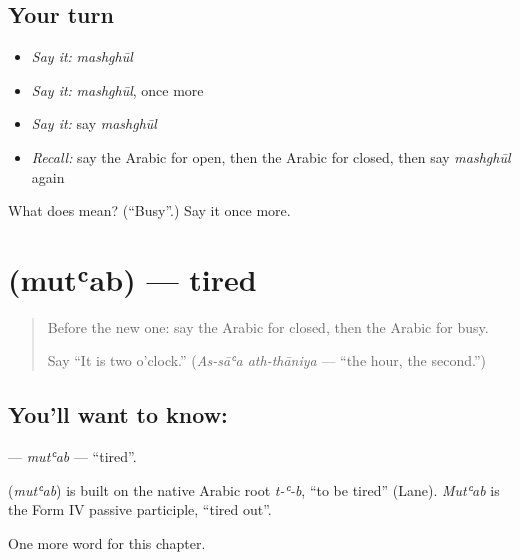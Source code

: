 \subsection*{Your turn}
\begin{itemize}
\raggedright
  \item \emph{Say it:} \emph{mashghūl}
  \item \emph{Say it:} \emph{mashghūl}, once more
  \item \emph{Say it:} say \emph{mashghūl}
  \item \emph{Recall:} say the Arabic for open, then the Arabic for closed, then say \emph{mashghūl} again
\end{itemize}

\begin{tcolorbox}[breakable,colback=teal!4,colframe=teal!35!black,title={Before you move on}]
What does  mean? (\textquotedblleft{}Busy\textquotedblright{}.) Say it once more.
\end{tcolorbox}
\section[\texorpdfstring{\ar{متعب} (mutʿab)}{متعب (mutʿab)}]{ (mutʿab) — tired}

\label{lesson:AR-C147-mutab}



\begin{quote}
Before the new one: say the Arabic for closed, then the Arabic for busy.

Say \textquotedblleft{}It is two o’clock.\textquotedblright{} (\emph{As-sāʿa ath-thāniya} — \textquotedblleft{}the hour, the second.\textquotedblright{})
\end{quote}

\subsection*{You'll want to know: }
\textbf{} — \emph{mutʿab} — \textquotedblleft{}tired\textquotedblright{}.

\begin{cousinweb}
\textbf{} (\emph{mutʿab}) is built on the native Arabic root \emph{t-ʿ-b}, \textquotedblleft{}to be tired\textquotedblright{} (Lane). \emph{Mutʿab} is the Form IV passive participle, \textquotedblleft{}tired out\textquotedblright{}.
\end{cousinweb}

\begin{grammarlens}[title={What you've built}]
One more word for this chapter.
\end{grammarlens}

